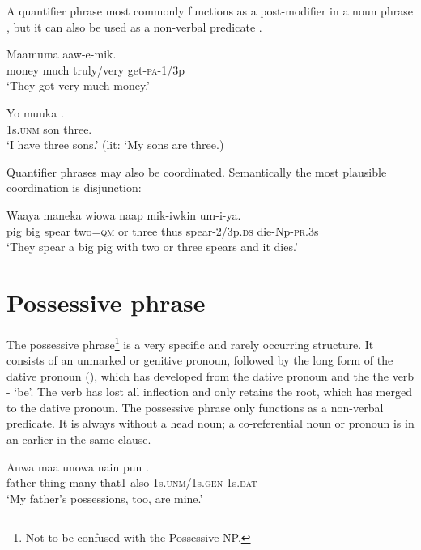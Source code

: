 A quantifier phrase most commonly functions as a post-modifier in a noun phrase , but it can also be used as a non-verbal predicate .

\ea%
\label{ex:4:x846}
\gll Maamuma     aaw-e-mik. \\
   money  much  truly/very  get-\textsc{pa}-1/3p   \\
\glt`They got very much money.'
\z

\ea%
\label{ex:4:x843}
\gll Yo  muuka  . \\
  1s.\textsc{unm}  son  three.    \\
\glt`I have three sons.'  (lit: `My sons are three.)
\z

Quantifier phrases may also be coordinated. Semantically the most plausible coordination is disjunction: 

\ea%
\label{ex:4:x1360}
\gll Waaya  maneka  wiowa      naap  mik-iwkin um-i-ya.\\
    pig  big  spear  two=\textsc{qm}  or  three  thus  spear-2/3p.\textsc{ds} die-Np-\textsc{pr}.3s   \\
\glt`They spear a big pig with two or three spears and it dies.'
\z

\section{Possessive phrase}
{}
The possessive phrase\footnote{Not to be confused with the Possessive NP.} is a very specific and rarely occurring structure. It consists of an unmarked or genitive pronoun, followed by the long form of the dative pronoun (), which has developed from the dative pronoun and the the verb - `be'. The verb has lost all inflection and only retains the root, which has merged to the dative pronoun. The possessive phrase only functions as a non-verbal predicate. It is always without a head noun; a co-referential noun or pronoun is in an earlier  in the same clause.

\ea%
\label{ex:4:x847}
\gll Auwa  maa  unowa  nain  pun   . \\
   father  thing  many  that1  also  1s.\textsc{unm}/1s.\textsc{gen}  1s.\textsc{dat}   \\
\glt`My father's possessions, too, are mine.'
\z

